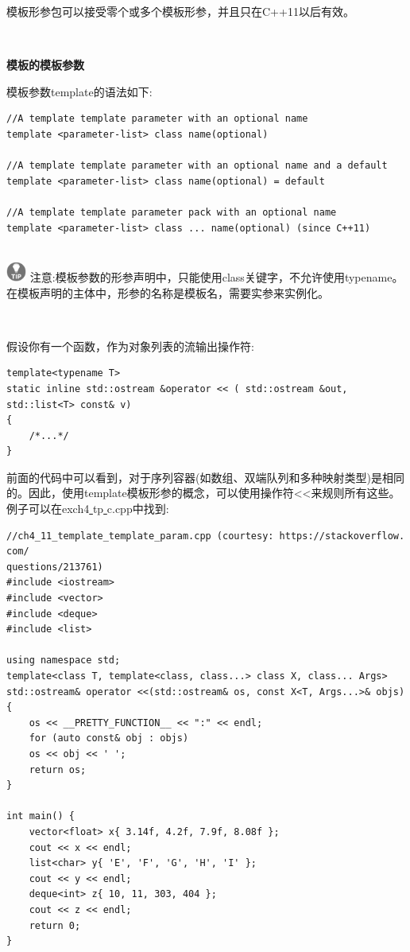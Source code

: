 模板形参包可以接受零个或多个模板形参，并且只在C++11以后有效。 \par

\noindent\textbf{}\ \par
\textbf{模板的模板参数} \ \par
模板参数template的语法如下: \par

\begin{lstlisting}[caption={}]
//A template template parameter with an optional name
template <parameter-list> class name(optional)

//A template template parameter with an optional name and a default
template <parameter-list> class name(optional) = default

//A template template parameter pack with an optional name
template <parameter-list> class ... name(optional) (since C++11)
\end{lstlisting}

\hspace*{\fill} \\ %
\includegraphics[width=0.05\textwidth]{images/tip}
注意:模板参数的形参声明中，只能使用class关键字，不允许使用typename。在模板声明的主体中，形参的名称是模板名，需要实参来实例化。\par
\noindent\textbf{}\ \par

假设你有一个函数，作为对象列表的流输出操作符: \par

\begin{lstlisting}[caption={}]
template<typename T>
static inline std::ostream &operator << ( std::ostream &out,
std::list<T> const& v)
{
	/*...*/
}
\end{lstlisting}

前面的代码中可以看到，对于序列容器(如数组、双端队列和多种映射类型)是相同的。因此，使用template模板形参的概念，可以使用操作符<<来规则所有这些。例子可以在exch4\underline{ }tp\underline{ }c.cpp中找到:\par

\begin{lstlisting}[caption={}]
//ch4_11_template_template_param.cpp (courtesy: https:/​/​stackoverflow.​com/
questions/​213761)
#include <iostream>
#include <vector>
#include <deque>
#include <list>

using namespace std;
template<class T, template<class, class...> class X, class... Args>
std::ostream& operator <<(std::ostream& os, const X<T, Args...>& objs) {
	os << __PRETTY_FUNCTION__ << ":" << endl;
	for (auto const& obj : objs)
	os << obj << ' ';
	return os;
}

int main() {
	vector<float> x{ 3.14f, 4.2f, 7.9f, 8.08f };
	cout << x << endl;
	list<char> y{ 'E', 'F', 'G', 'H', 'I' };
	cout << y << endl;
	deque<int> z{ 10, 11, 303, 404 };
	cout << z << endl;
	return 0;
}
\end{lstlisting}

